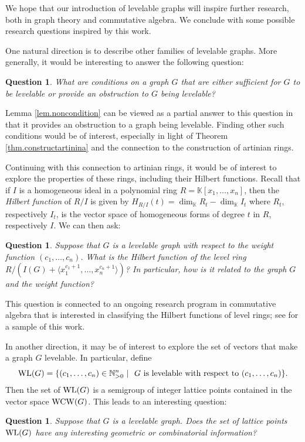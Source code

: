 \documentclass[12pt]{amsart}
\numberwithin{equation}{section}
\newtheorem{question}[theorem]{Question}
\theoremstyle{definition}
\newcounter{i} %
\begin{document}
We hope that our introduction
of levelable graphs will inspire further research, 
both in graph theory and commutative algebra.  We conclude
with some possible research questions inspired by 
this work.

One natural direction is to describe other 
families of levelable graphs.  More generally, it would
be interesting to answer the following question:

\begin{question}
    What are conditions on a graph $G$ that are either
    sufficient for $G$ to be levelable or provide an
    obstruction to $G$ being levelable?
\end{question}

\noindent
Lemma \ref{lem.noncondition} can be viewed as a partial
answer to this question in that it provides an obstruction
to a graph being levelable.  Finding other such conditions would be of interest, especially in light of 
Theorem \ref{thm.constructartinina} and the connection
to the construction of artinian rings.

Continuing with this connection to artinian rings,
it would be of interest to explore the properties
of these rings, including their Hilbert functions.
Recall that if $I$ is a homogeneous ideal in
a polynomial ring $R = \mathbb{K}[x_1,\ldots,x_n]$, then
the {\it Hilbert function} of $R/I$ is given
by $H_{R/I}(t) = \dim_\mathbb{K} R_t  - \dim_{\mathbb{K}} I_t$
where $R_t$, respectively $I_t$, is the vector
space of homogeneous forms of degree $t$ in $R$, respectively $I$.
We can then ask:

\begin{question}
    Suppose that $G$ is a levelable graph with
    respect to the weight function $(c_1,\ldots,c_n)$.
    What is the Hilbert function of the level
    ring $R/(I(G) + \langle x_1^{c_1+1},\ldots,x_n^{c_n+1}\rangle)$?  In particular,
    how is it related to the graph $G$ and the weight function?
\end{question}
\noindent
This question is connected to an ongoing research program in
commutative algebra that is interested in classifying the
Hilbert functions of level rings;  see
\cite{GHMS2007,HSZ,HLO,H88,H89,MNZ} for a
sample of this work.  

In another direction, it may be of interest to explore
the set of vectors that make a graph $G$ levelable.  
In particular, define 
$${\rm WL}(G) = \{(c_1,\ldots,c_n) \in \mathbb{N}_{>0}^n ~|~ \mbox{
$G$ is levelable with respect to $(c_1,\ldots,c_n)$}\}.$$
Then the set of ${\rm WL}(G)$ is a semigroup
of integer lattice points contained in 
the vector space ${\rm WCW}(G)$.
This leads to an interesting question:
\begin{question}
    Suppose that $G$ is a levelable graph. 
    Does the set of lattice points
    ${\rm WL}(G)$ have any interesting
    geometric or combinatorial information?  
\end{question}
\end{document}
